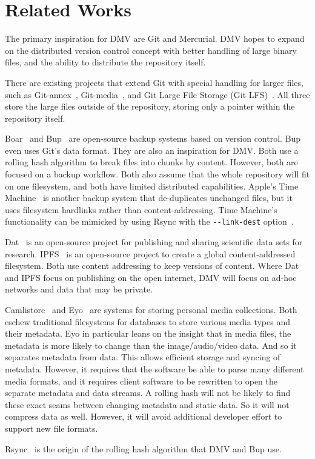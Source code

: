 \section{Related Works}

The primary inspiration for DMV are Git and Mercurial.
DMV hopes to expand on the distributed version control concept with better handling of large binary files, and the ability to distribute the repository itself.

There are existing projects that extend Git with special handling for larger files, such as Git-annex~\cite{git_annex_homepage}, Git-media~\cite{git_media_github}, and Git Large File Storage (Git LFS)~\cite{git_lfs_homepage}.
All three store the large files outside of the repository, storing only a pointer within the repository itself.

Boar~\cite{boar_homepage} and Bup~\cite{bup_homepage} are open-source backup systems based on version control.
Bup even uses Git's data format.
They are also an inspiration for DMV.
Both use a rolling hash algorithm to break files into chunks by content.
However, both are focused on a backup workflow.
Both also assume that the whole repository will fit on one filesystem, and both have limited distributed capabilities.
Apple's Time Machine~\cite{timemachine_patent} is another backup system that de-duplicates unchanged files, but it uses filesystem hardlinks rather than content-addressing.
Time Machine's functionality can be mimicked by using Rsync with the \lstinline{--link-dest} option~\cite{timemachine_foreveryunix}.

Dat~\cite{dat_homepage} is an open-source project for publishing and sharing scientific data sets for research.
IPFS~\cite{ipfs_github_main} is an open-source pro\-ject to create a global content-addressed filesystem.
Both use content addressing to keep versions of content.
Where Dat and IPFS focus on publishing on the open internet, DMV will focus on ad-hoc networks and data that may be private.

Camlistore~\cite{camlistore_homepage} and Eyo~\cite{Strauss:2011:EDP:2002181.2002216} are systems for storing personal media collections.
Both eschew traditional filesystems for databases to store various media types and their metadata.
Eyo in particular leans on the insight that in media files, the metadata is more likely to change than the image/audio/video data.
And so it separates metadata from data.
This allows efficient storage and syncing of metadata.
However, it requires that the software be able to parse many different media formats, and it requires client software to be rewritten to open the separate metadata and data streams.
A rolling hash will not be likely to find these exact seams between changing metadata and static data.
So it will not compress data as well.
However, it will avoid additional developer effort to support new file formats.

Rsync~\cite{rsynctechreport} is the origin of the rolling hash algorithm that DMV and Bup use.

